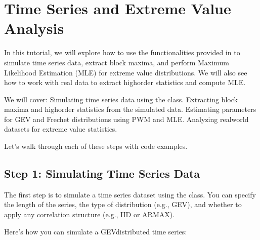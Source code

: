 \documentclass[a4paper,11pt,openany,english]{sphinxmanual}
\begin{document}
\chapter{Time Series and Extreme Value Analysis}
\label{\detokenize{topt:time-series-and-extreme-value-analysis}}\label{\detokenize{topt::doc}}
\sphinxAtStartPar
In this tutorial, we will explore how to use the functionalities provided in  to simulate time series data, extract block maxima, and perform Maximum Likelihood Estimation (MLE) for extreme value distributions. We will also see how to work with real data to extract high\sphinxhyphen{}order statistics and compute MLE.

\sphinxAtStartPar
We will cover:
\sphinxhyphen{} Simulating time series data using the  class.
\sphinxhyphen{} Extracting block maxima and high\sphinxhyphen{}order statistics from the simulated data.
\sphinxhyphen{} Estimating parameters for GEV and Frechet distributions using PWM and MLE.
\sphinxhyphen{} Analyzing real\sphinxhyphen{}world datasets for extreme value statistics.

\sphinxAtStartPar
Let’s walk through each of these steps with code examples.


\section{Step 1: Simulating Time Series Data}
\label{\detokenize{topt:step-1-simulating-time-series-data}}
\sphinxAtStartPar
The first step is to simulate a time series dataset using the  class. You can specify the length of the series, the type of distribution (e.g., GEV), and whether to apply any correlation structure (e.g., IID or ARMAX).

\sphinxAtStartPar
Here’s how you can simulate a GEV\sphinxhyphen{}distributed time series:

\begin{sphinxVerbatim}[commandchars=\\\{\}]
   

     \PYG{p}{[}\PYG{p}{]}


\end{sphinxVerbatim}
\end{document}
